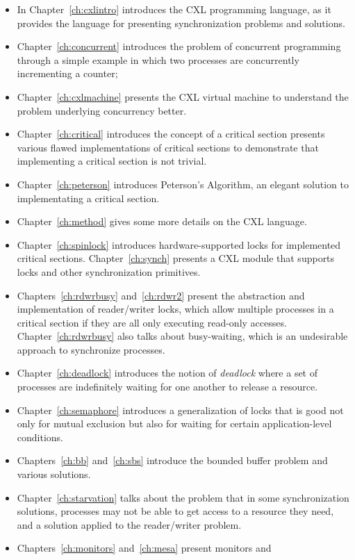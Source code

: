 \documentclass{report}
\begin{document}
\begin{itemize}
\item In Chapter~\ref{ch:cxlintro} introduces the CXL programming
language, as it provides the language for presenting synchronization
problems and solutions.
\item Chapter~\ref{ch:concurrent} introduces the problem of
concurrent programming through a simple example in which two processes
are concurrently incrementing a counter;
\item Chapter~\ref{ch:cxlmachine} presents the
CXL virtual machine to understand the problem
underlying concurrency better.
\item Chapter~\ref{ch:critical} introduces the concept of a critical
section presents various flawed implementations
of critical sections to demonstrate that implementing a critical section
is not trivial.
\item Chapter~\ref{ch:peterson} introduces Peterson's Algorithm, an
elegant solution to implementating a critical section.
\item Chapter~\ref{ch:method} gives some more details on the CXL
language.
\item Chapter~\ref{ch:spinlock} introduces hardware-supported locks
for implemented critical sections.  Chapter~\ref{ch:synch} presents a CXL module
that supports locks and other synchronization primitives.
\item Chapters~\ref{ch:rdwrbusy} and~\ref{ch:rdwr2} present the
abstraction and implementation of reader/writer
locks, which allow multiple processes in a critical section if they are
all only executing read-only accesses.
Chapter~\ref{ch:rdwrbusy} also talks about busy-waiting, which is
an undesirable approach to synchronize processes.
\item Chapter~\ref{ch:deadlock} introduces the notion of \emph{deadlock}
where a set of processes are indefinitely waiting for one another to
release a resource.
\item Chapter~\ref{ch:semaphore} introduces a generalization of locks
that is good not only for mutual exclusion but also for waiting for
certain application-level conditions.
\item Chapters~\ref{ch:bb} and~\ref{ch:sbs} introduce the bounded buffer
problem and various solutions.
\item Chapter~\ref{ch:starvation} talks about the problem that in some
synchronization solutions, processes may not be able to get access to a
resource they need, and a solution applied to the reader/writer problem.
\item Chapters~\ref{ch:monitors} and~\ref{ch:mesa} present monitors and

\end{itemize}
\end{document}
